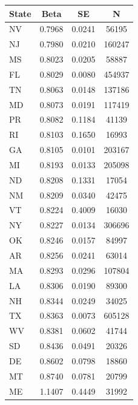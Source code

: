 \begin{tabular}{l c c c}
\hline
State & Beta & SE & N \\
\hline
NV & 0.7968 & 0.0241 & 56195 \\
NJ & 0.7980 & 0.0210 & 160247 \\
MS & 0.8023 & 0.0205 & 58887 \\
FL & 0.8029 & 0.0080 & 454937 \\
TN & 0.8063 & 0.0148 & 137186 \\
MD & 0.8073 & 0.0191 & 117419 \\
PR & 0.8082 & 0.1184 & 41139 \\
RI & 0.8103 & 0.1650 & 16993 \\
GA & 0.8105 & 0.0101 & 203167 \\
MI & 0.8193 & 0.0133 & 205098 \\
ND & 0.8208 & 0.1331 & 17054 \\
NM & 0.8209 & 0.0340 & 42475 \\
VT & 0.8224 & 0.4009 & 16030 \\
NY & 0.8227 & 0.0134 & 306696 \\
OK & 0.8246 & 0.0157 & 84997 \\
AR & 0.8256 & 0.0241 & 63014 \\
MA & 0.8293 & 0.0296 & 107804 \\
LA & 0.8306 & 0.0190 & 89300 \\
NH & 0.8344 & 0.0249 & 34025 \\
TX & 0.8363 & 0.0073 & 605128 \\
WV & 0.8381 & 0.0602 & 41744 \\
SD & 0.8436 & 0.0491 & 20326 \\
DE & 0.8602 & 0.0798 & 18860 \\
MT & 0.8740 & 0.0781 & 20799 \\
ME & 1.1407 & 0.4449 & 31992 \\
\hline
\end{tabular}
